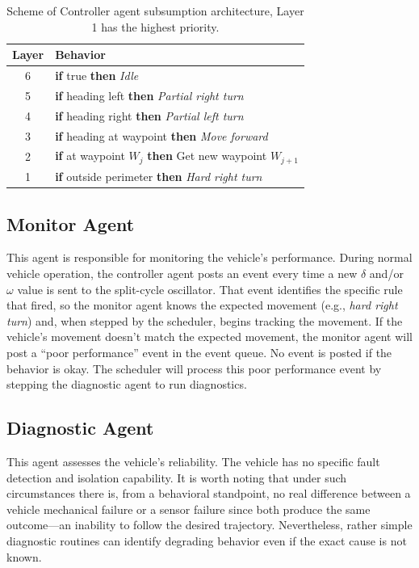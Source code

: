 \begin{table}
\centering
\renewcommand{\arraystretch}{1.7}
\begin{tabular}{>{\small}c>{\small}l}
\hline
Layer & Behavior\\
\hline
\rowcolor{Gray}
6 & \textbf{if} true \textbf{then} \textit{Idle} \\
5 & \textbf{if} heading left \textbf{then} \textit{Partial right turn}\\
\rowcolor{Gray}
4 & \textbf{if} heading right \textbf{then} \textit{Partial left turn}\\
3 & \textbf{if} heading at waypoint \textbf{then} \textit{Move forward}\\
\rowcolor{Gray}
2 & \textbf{if} at waypoint $W_j$ \textbf{then} Get new waypoint $W_{j+1}$\\
1 & \textbf{if} outside perimeter \textbf{then} \textit{Hard right turn}\\
\hline
\end{tabular}
\newline
\caption[Controller agent subsumption architecture]{Scheme of Controller agent subsumption architecture, Layer 1 has the highest priority.}
\label{tab-subsum}
\end{table}

\subsection{Monitor Agent}
\label{subsec-monitorAgent}

This agent is responsible for monitoring the vehicle's performance. During normal vehicle operation, the controller agent posts an event every time a new $\delta$ and/or $\omega$ value is sent to the split-cycle oscillator. That event identifies the specific rule that fired, so the monitor agent knows the expected movement (e.g., \textit{hard right turn}) and, when stepped by the scheduler, begins tracking the movement. If the vehicle's movement doesn't match the expected movement, the monitor agent will post a ``poor performance'' event in the event queue. No event is posted if the behavior is okay. The scheduler will process this poor performance event by stepping the diagnostic agent to run diagnostics.


\subsection{Diagnostic Agent}
\label{subsec-DiagnosticAgent}
This agent assesses the vehicle's reliability. The vehicle has no specific fault detection and isolation capability. It is worth noting that under such circumstances there is, from a behavioral standpoint, no real difference between a vehicle mechanical failure or a sensor failure since both produce the same outcome---an inability to follow the desired trajectory. Nevertheless, rather simple diagnostic routines can identify degrading behavior even if the exact cause is not known.

